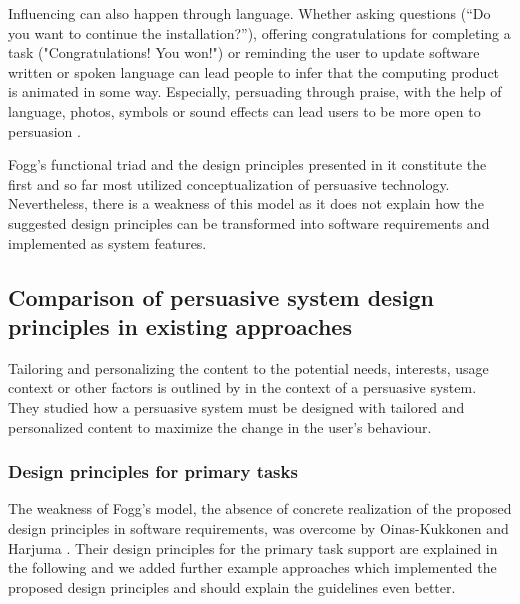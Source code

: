Influencing can also happen through language. Whether asking questions
(“Do you want to continue the installation?”), offering congratulations for
completing a task ("Congratulations! You won!") or reminding the user to update software written or spoken language can lead people to infer that the computing product is animated in some way. Especially, persuading through praise, with the help of language, photos, symbols or sound effects can lead users to be more open to persuasion \cite{fogg2002persuasive}.

Fogg’s \cite{fogg2002persuasive} functional triad and the design principles presented in it constitute the first and so far most utilized conceptualization of persuasive technology. Nevertheless, there is a weakness of this model as it does not explain how the suggested design principles can be transformed into software requirements and implemented as system features.

\subsection{Comparison of persuasive system design principles in existing approaches}

Tailoring and personalizing the content to the potential needs, interests, usage context or other factors is outlined by \cite{oinas2009persuasive} in the context of a persuasive system. They studied how a persuasive system must be designed with tailored and personalized content to maximize the change in the user's behaviour. 

\subsubsection{Design principles for primary tasks}
\label{subsec:primaryTask}

The weakness of Fogg's model, the absence of concrete realization of the proposed design principles in software requirements, was overcome by Oinas-Kukkonen and Harjuma \cite{oinas2009persuasive}. Their design principles for the primary task support are explained in the following and we added further example approaches which implemented the proposed design principles and should explain the guidelines even better.

